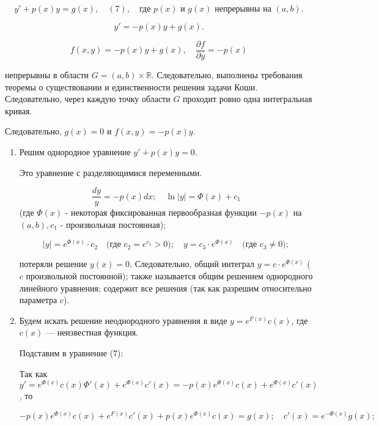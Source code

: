 {	\[
	y' + p(x)y = g(x), \quad (7), \quad \text{где } p(x) \text{ и } g(x) \text{ непрерывны на } (a, b).
	\]





	\[
	y' = -p(x)y + g(x).
	\]





	\[
	f(x, y) = -p(x)y + g(x), \quad \frac{\partial f}{\partial y} = -p(x)
	\]



	непрерывны в области \( G = (a, b) \times \mathbb{R} \). Следовательно, выполнены требования теоремы о существовании и единственности решения задачи Коши. Следовательно, через каждую точку области \( G \) проходит ровно одна интегральная кривая.

	Следовательно, \( g(x) = 0 \) и \( f(x, y) = -p(x)y \).

	\begin{enumerate}
		\item Решим однородное уравнение \( y' + p(x)y = 0 \).

		Это уравнение с разделяющимися переменными.



		\[
		\frac{dy}{y} = -p(x)dx ; \quad \ln |y| = \Phi(x) + c_1\] 
		(где  $\Phi(x)$ - некоторая фиксированная первообразная функции $-p(x)$ на $(a, b), c_1$ - произвольная постоянная);





		\[
		|y| = e^{\Phi(x)} \cdot c_2 \quad \text{(где } c_2 = e^{c_1} > 0); \quad y = c_3 \cdot e^{\Phi(x)} \quad \text{(где } c_3 \neq 0);
		\]



		потеряли решение \( y(x) = 0 \). Следовательно, общий интеграл \( y = c \cdot e^{\Phi(x)} \) ($c$ произвольной постоянной); также называется общим решением однородного линейного уравнения; содержит все решения (так как разрешим относительно параметра \( c \)).

		\item Будем искать решение неоднородного уравнения в виде \( y = e^{F(x)} c(x) \), где \( c(x) \) — неизвестная функция.

		Подставим в уравнение (7):

		Так как \( y' = e^{\Phi(x)} c(x)\Phi'(x) + e^{\Phi(x)} c'(x) = -p(x) e^{\Phi(x)}c(x) + e^{\Phi(x)}c'(x)\), то



		\[
		-p(x) e^{\Phi(x)} c(x) + e^{F(x)} c'(x) + p(x) e^{\Phi(x)} c(x) = g(x); \quad c'(x) = e^{-\Phi(x)} g(x);
		\]






\end{enumerate}}
